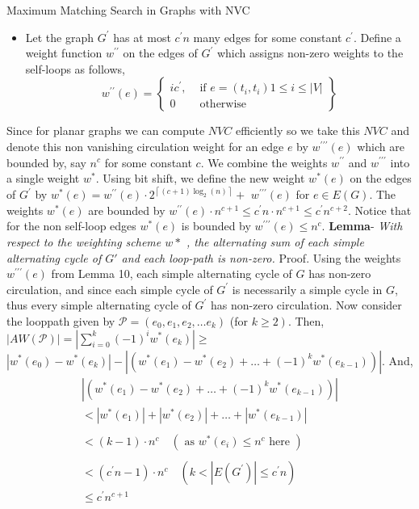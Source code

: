 \documentclass{beamer}
\begin{document}
\begin{frame}[allowframebreaks]{Maximum Matching Search in Graphs with NVC}
\begin{itemize}
   \item Let the graph $G^{\prime}$ has at most $c^{\prime} n$ many edges for some constant $c^{\prime}$. Define a weight function $w^{\prime \prime}$ on the edges of $G^{\prime}$ which assigns non-zero weights to the self-loops as follows,
   $$
   w^{\prime \prime}(e)=\left\{\begin{array}{lr}
   	i c^{\prime}, & \text { if } e=\left(t_i, t_i\right) 1 \leq i \leq|V| \\
   	0 & \text { otherwise }
   \end{array}\right\}
   $$
\end{itemize}
\break
Since for planar graphs we can compute $NVC$ efficiently so we take this $NVC$ and
denote this non vanishing circulation weight for an edge $e$ by $w^{\prime \prime \prime}(e)$ which are bounded by, say $n^c$ for some constant $c$. We combine the weights $w^{\prime \prime}$ and $w^{\prime \prime \prime}$ into a single weight $w^*$. Using bit shift, we define the new weight $w^*(e)$ on the edges of $G^{\prime}$ by $w^*(e)=w^{\prime \prime}(e) \cdot 2^{\left\lceil(c+1) \log _2(n)\right\rceil}+$ $w^{\prime \prime \prime}(e)$ for $e \in E(G)$. The weights $w^*(e)$ are bounded by $w^{\prime \prime}(e) \cdot n^{c+1} \leq c^{\prime} n \cdot n^{c+1} \leq c^{\prime} n^{c+2}$. Notice that for the non self-loop edges $w^*(e)$ is bounded by $w^{\prime \prime \prime}(e) \leq n^c$.
\break\break
\textbf{Lemma}- \textit{With respect to the weighting scheme $w*$ , the alternating sum of each simple alternating cycle of $G'$ and each loop-path is non-zero.}
Proof. Using the weights $w^{\prime \prime \prime}(e)$ from Lemma 10, each simple alternating cycle of $G$ has non-zero circulation, and since each simple cycle of $G^{\prime}$ is necessarily a simple cycle in $G$, thus every simple alternating cycle of $G^{\prime}$ has non-zero circulation. Now consider the looppath given by $\mathcal{P}=\left(e_0, e_1, e_2, \ldots e_k\right)$ (for $\left.k \geq 2\right)$. Then, $|A W(\mathcal{P})|=\left|\sum_{i=0}^k(-1)^i w^*\left(e_k\right)\right| \geq$ $\left|w^*\left(e_0\right)-w^*\left(e_k\right)\right|-\left|\left(w^*\left(e_1\right)-w^*\left(e_2\right)+\ldots+(-1)^k w^*\left(e_{k-1}\right)\right)\right|$. And,
$$
\begin{aligned}
	\left|\left(w^*\left(e_1\right)-w^*\left(e_2\right)+\ldots+(-1)^k w^*\left(e_{k-1}\right)\right)\right| \\ <\left|w^*\left(e_1\right)\right|+\left|w^*\left(e_2\right)\right|+\ldots+\left|w^*\left(e_{k-1}\right)\right| \\
	\\ <(k-1) \cdot n^c \quad\left(\text { as } w^*\left(e_i\right) \leq n^c \text { here }\right) \\
	\\ <\left(c^{\prime} n-1\right) \cdot n^c \quad\left(k<\left|E\left(G^{\prime}\right)\right| \leq c^{\prime} n\right) \\
	 \leq c^{\prime} n^{c+1}
\end{aligned}
$$


\end{frame}
\end{document}
